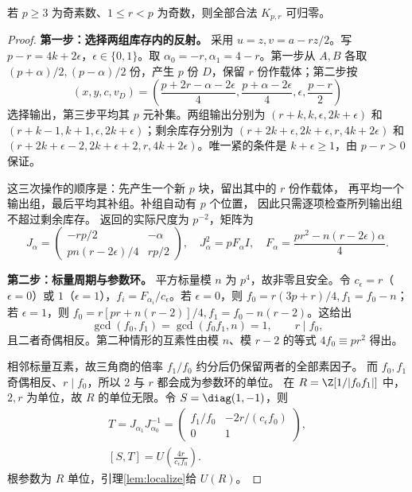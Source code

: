 \begin{proposition}[奇数余量的全部合法核心]\label{prop:odd}
若 $p\ge3$ 为奇素数、$1\le r<p$ 为奇数，则全部合法 $K_{p,r}$ 可归零。
\end{proposition}
\begin{proof}

\par\noindent\textbf{第一步：选择两组库存内的反射。}
采用 $u=z,v=a-rz/2$。写 $p-r=4k+2\epsilon$，$\epsilon\in\{0,1\}$。取 $\alpha_0=-r,\alpha_1=4-r$。第一步从 $A,B$ 各取 $(p+\alpha)/2,(p-\alpha)/2$ 份，产生 $p$ 份 $D$，保留 $r$ 份作载体；第二步按
\[
(x,y,c,v_D)=\left(\frac{p+2r-\alpha-2\epsilon}{4},\frac{p+\alpha-2\epsilon}{4},\epsilon,\frac{p-r}{2}\right)
\]
选择输出，第三步平均其 $p$ 元补集。两组输出分别为 $(r+k,k,\epsilon,2k+\epsilon)$ 和 $(r+k-1,k+1,\epsilon,2k+\epsilon)$；剩余库存分别为 $(r+2k+\epsilon,2k+\epsilon,r,4k+2\epsilon)$ 和 $(r+2k+\epsilon-2,2k+\epsilon+2,r,4k+2\epsilon)$。唯一紧的条件是 $k+\epsilon\ge1$，由 $p-r>0$ 保证。

这三次操作的顺序是：先产生一个新 $p$ 块，留出其中的 $r$ 份作载体，
再平均一个输出组，最后平均其补组。补组自动有 $p$ 个位置，
因此只需逐项检查所列输出组不超过剩余库存。
返回的实际尺度为 $p^{-2}$，矩阵为
\[
J_\alpha=\begin{pmatrix}-rp/2&-\alpha\\pn(r-2\epsilon)/4&rp/2\end{pmatrix},
\quad J_\alpha^2=pF_\alpha I,\quad F_\alpha=\frac{pr^2-n(r-2\epsilon)\alpha}{4}.
\]

\par\noindent\textbf{第二步：标量周期与参数环。}
平方标量模 $n$ 为 $p^4$，故非零且安全。令 $c_\epsilon=r$（$\epsilon=0$）或 $1$（$\epsilon=1$），$f_i=F_{\alpha_i}/c_\epsilon$。若 $\epsilon=0$，则 $f_0=r(3p+r)/4,f_1=f_0-n$；若 $\epsilon=1$，则 $f_0=r[pr+n(r-2)]/4,f_1=f_0-n(r-2)$。这给出
\[
\gcd(f_0,f_1)=\gcd(f_0f_1,n)=1,\qquad r\mid f_0,
\]
且二者奇偶相反。第二种情形的互素性由模 $n$、模 $r-2$ 的等式 $4f_0\equiv pr^2$ 得出。

相邻标量互素，故三角商的倍率 $f_1/f_0$ 约分后仍保留两者的全部素因子。
而 $f_0,f_1$ 奇偶相反、$r\mid f_0$，所以 $2$ 与 $r$ 都会成为参数环的单位。
在 $R=\Z[1/|f_0f_1|]$ 中，$2,r$ 为单位，故 $R$ 的单位无限。令 $S=\diag(1,-1)$，则
\begin{gather*}
T=J_{\alpha_1}J_{\alpha_0}^{-1}
=\begin{pmatrix}f_1/f_0&-2r/(c_\epsilon f_0)\\0&1\end{pmatrix},\\
[S,T]=U\left(\frac{4r}{c_\epsilon f_0}\right).
\end{gather*}
根参数为 $R$ 单位，引理\ref{lem:localize}给 $U(R)$。


\end{proof}

